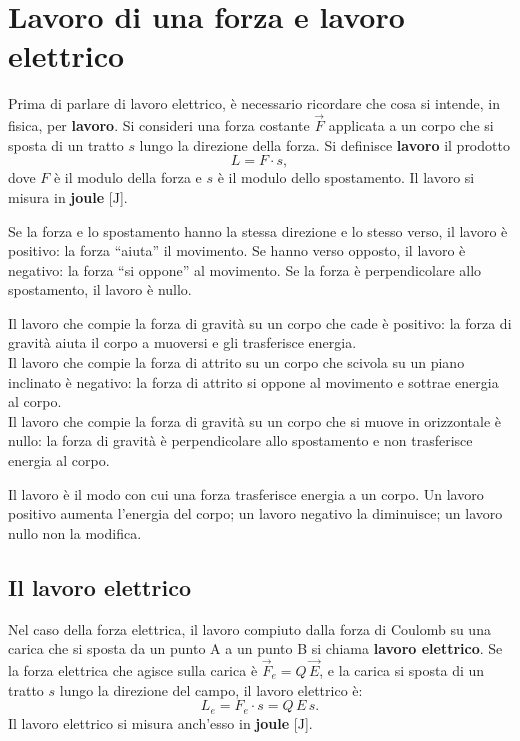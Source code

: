 \section{Lavoro di una forza e lavoro elettrico}


Prima di parlare di lavoro elettrico, è necessario ricordare che cosa si intende, in fisica, per \textbf{lavoro}. Si consideri una forza costante \(\vec{F}\) applicata a un corpo che si sposta di un tratto \(s\) lungo la direzione della forza. Si definisce \textbf{lavoro} il prodotto
\[
L = F \cdot s,
\]
dove \(F\) è il modulo della forza e \(s\) è il modulo dello spostamento. Il lavoro si misura in \textbf{joule} [\(\text{J}\)].

Se la forza e lo spostamento hanno la stessa direzione e lo stesso verso, il lavoro è positivo: la forza ``aiuta'' il movimento. Se hanno verso opposto, il lavoro è negativo: la forza ``si oppone'' al movimento. Se la forza è perpendicolare allo spostamento, il lavoro è nullo.

\begin{esempio}
    Il lavoro che compie la forza di gravità su un corpo che cade è positivo: la forza di gravità aiuta il corpo a muoversi e gli trasferisce energia.\\
    Il lavoro che compie la forza di attrito su un corpo che scivola su un piano inclinato è negativo: la forza di attrito si oppone al movimento e sottrae energia al corpo.\\
    Il lavoro che compie la forza di gravità su un corpo che si muove in orizzontale è nullo: la forza di gravità è perpendicolare allo spostamento e non trasferisce energia al corpo.
\end{esempio}


\begin{concetto}
Il lavoro è il modo con cui una forza trasferisce energia a un corpo. Un lavoro positivo aumenta l'energia del corpo; un lavoro negativo la diminuisce; un lavoro nullo non la modifica.
\end{concetto}

\subsection{Il lavoro elettrico}

Nel caso della forza elettrica, il lavoro compiuto dalla forza di Coulomb su una carica che si sposta da un punto A a un punto B si chiama \textbf{lavoro elettrico}. Se la forza elettrica che agisce sulla carica è \(\vec{F}_e = Q\,\vec{E}\), e la carica si sposta di un tratto \(s\) lungo la direzione del campo, il lavoro elettrico è:
\[
L_e = F_e \cdot s = Q\,E\,s.
\]
Il lavoro elettrico si misura anch'esso in \textbf{joule} [\(\text{J}\)].

